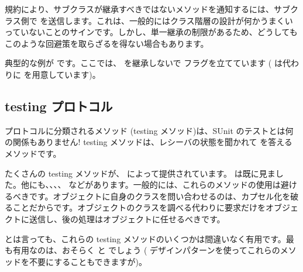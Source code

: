 \documentclass[a4paper,10pt,twoside]{book}
\begin{document}
規約により、サブクラスが継承すべきではないメソッドを通知するには、サブクラス側で  を送信します。これは、一般的にはクラス階層の設計が何かうまくいっていないことのサインです。しかし、単一継承の制限があるため、どうしてもこのような回避策を取らざるを得ない場合もあります。

典型的な例が  です。ここでは、 を継承しないで  フラグを立てています ( は代わりに  を用意しています)。



\subsection{testing プロトコル}%

 プロトコルに分類されるメソッド (testing メソッド)は、SUnit のテストとは何の関係もありません! testing メソッドは、レシーバの状態を聞かれて  を答えるメソッドです。

たくさんの testing メソッドが、 によって提供されています。 は既に見ました。他にも、、、、 などがあります。一般的には、これらのメソッドの使用は避けるべきです。オブジェクトに自身のクラスを問い合わせるのは、カプセル化を破ることだからです。オブジェクトのクラスを調べる代わりに要求だけをオブジェクトに送信し、後の処理はオブジェクトに任せるべきです。%

とは言っても、これらの testing メソッドのいくつかは間違いなく有用です。最も有用なのは、おそらく  と  でしょう (\cite{Wool98a} デザインパターンを使ってこれらのメソッドを不要にすることもできますが)。

\end{document}
